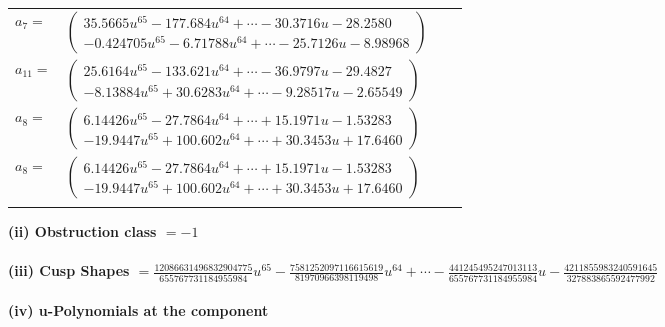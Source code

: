 \documentclass[1p]{elsarticle_modified}
\theoremstyle{definition}
\begin{document}
\begin{tabular}{m{7pt} m{180pt} m{7pt} m{180pt} }
\flushright $a_{7}=$&$\begin{pmatrix}35.5665 u^{65}-177.684 u^{64}+\cdots-30.3716 u-28.2580\\-0.424705 u^{65}-6.71788 u^{64}+\cdots-25.7126 u-8.98968\end{pmatrix}$ \\
\flushright $a_{11}=$&$\begin{pmatrix}25.6164 u^{65}-133.621 u^{64}+\cdots-36.9797 u-29.4827\\-8.13884 u^{65}+30.6283 u^{64}+\cdots-9.28517 u-2.65549\end{pmatrix}$ \\
\flushright $a_{8}=$&$\begin{pmatrix}6.14426 u^{65}-27.7864 u^{64}+\cdots+15.1971 u-1.53283\\-19.9447 u^{65}+100.602 u^{64}+\cdots+30.3453 u+17.6460\end{pmatrix}$\\ \flushright $a_{8}=$&$\begin{pmatrix}6.14426 u^{65}-27.7864 u^{64}+\cdots+15.1971 u-1.53283\\-19.9447 u^{65}+100.602 u^{64}+\cdots+30.3453 u+17.6460\end{pmatrix}$\\&\end{tabular}
\flushleft \textbf{(ii) Obstruction class $= -1$}\\~\\
\flushleft \textbf{(iii) Cusp Shapes $= \frac{12086631496832904775}{655767731184955984} u^{65}-\frac{7581252097116615619}{81970966398119498} u^{64}+\cdots-\frac{441245495247013113}{655767731184955984} u-\frac{4211855983240591645}{327883865592477992}$}\\~\\
\newpage\renewcommand{\arraystretch}{1}
\flushleft \textbf{(iv) u-Polynomials at the component}\newline \\
\end{document}
